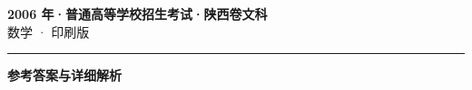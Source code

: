 \documentclass[zihao=5, a4paper]{ctexart}
\begin{document}
\begin{center}
  {\Large\bfseries 2006 年·普通高等学校招生考试·陕西卷文科}\\[4pt]
  {\large 数学 · 印刷版}
\end{center}
\medskip
{}

\par\bigskip\hrule\bigskip
{}
\begin{center}{\large\bfseries 参考答案与详细解析}\end{center}
\smallskip

\end{document}
